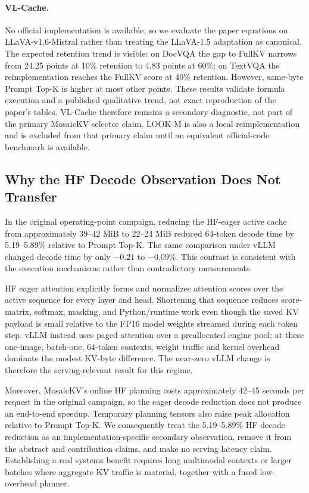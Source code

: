 \paragraph{VL-Cache.}
No official implementation is available, so we evaluate the paper equations
on LLaVA-v1.6-Mistral rather than treating the LLaVA-1.5 adaptation as
canonical.  The expected retention trend is visible: on DocVQA the gap to
FullKV narrows from 24.25 points at 10\% retention to 4.83 points at 60\%; on
TextVQA the reimplementation reaches the FullKV score at 40\% retention.
However, same-byte Prompt Top-K is higher at most other points.  These results
validate formula execution and a published qualitative trend, not exact
reproduction of the paper's tables.  VL-Cache therefore remains a secondary
diagnostic, not part of the primary MosaicKV selector claim.  LOOK-M is also
a local reimplementation and is excluded from that primary claim until an
equivalent official-code benchmark is available.

\subsection{Why the HF Decode Observation Does Not Transfer}
\label{sec:eval-systems}

In the original operating-point campaign, reducing the HF-eager active cache
from approximately 39--42 MiB to 22--24 MiB reduced 64-token decode time by
5.19--5.89\% relative to Prompt Top-K.  The same comparison under vLLM changed
decode time by only \(-0.21\) to \(-0.09\)\%.  This contrast is consistent
with the execution mechanisms rather than contradictory measurements.

HF eager attention explicitly forms and normalizes attention scores over the
active sequence for every layer and head.  Shortening that sequence reduces
score-matrix, softmax, masking, and Python/runtime work even though the saved
KV payload is small relative to the FP16 model weights streamed during each
token step.  vLLM instead uses paged attention over a preallocated engine
pool; at these one-image, batch-one, 64-token contexts, weight traffic and
kernel overhead dominate the modest KV-byte difference.  The near-zero vLLM
change is therefore the serving-relevant result for this regime.

Moreover, MosaicKV's online HF planning costs approximately 42--45 seconds
per request in the original campaign, so the eager decode reduction does not
produce an end-to-end speedup.  Temporary planning tensors also raise peak
allocation relative to Prompt Top-K.  We consequently treat the 5.19--5.89\%
HF decode reduction as an implementation-specific secondary observation,
remove it from the abstract and contribution claims, and make no serving
latency claim.  Establishing a real systems benefit requires long multimodal
contexts or larger batches where aggregate KV traffic is material, together
with a fused low-overhead planner.

